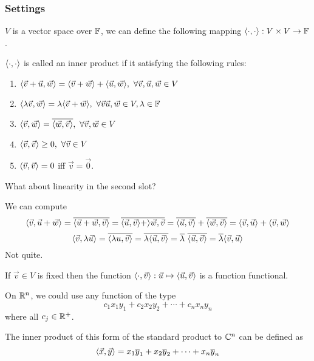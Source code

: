\subsubsection*{Settings}
$V$ is a vector space over $\mathbb F$, we can define the following mapping $ \langle \cdot, \cdot \rangle : V \times V \to \mathbb F$.
\begin{definition}
$\langle \cdot, \cdot \rangle$ is called an inner product if it satisfying the following rules:
\begin{enumerate}
    \item $\langle \vec v + \vec u, \vec w \rangle = \langle \vec v + \vec w \rangle + \langle \vec u, \vec w \rangle, \ \forall \vec v, \vec u, \vec w \in V$
    \item $\langle \lambda \vec v, \vec w \rangle = \lambda \langle \vec v + \vec w \rangle, \ \forall \vec v \vec u, \vec w \in V, \lambda \in \mathbb F$
    \item $\langle \vec v, \vec w \rangle = \overline{\langle \vec w, \vec v \rangle}, \ \forall \vec v,\vec w \in V$
    \item $\la \vec v, \vec v \ra \geq 0, \ \forall \vec v \in V$
    \item $\langle \vec v, \vec v \rangle = 0$ iff $\vec v = \vec 0$.
\end{enumerate}
\end{definition}
\begin{question}
What about linearity in the second slot?
\end{question}
\begin{answer} We can compute
\[ \langle \vec v, \vec u + \vec w \rangle = \overline{\langle \vec u + \vec w, \vec v\rangle} = \overline{\langle \vec u, \vec v \rangle + \rangle \vec w, \vec v} = \overline{\langle \vec u, \vec v \rangle} + \overline{\langle \vec w, \vec v\rangle } = \langle \vec v, \vec u\rangle + \langle \vec v, \vec w\rangle\]
\[ \langle \vec v, \lambda \vec u\rangle = \overline{\langle \lambda u, \vec v\rangle} = \overline{\lambda \langle \vec u,\vec v\rangle} = \overline \lambda \ \overline{\langle \vec u, \vec v\rangle} = \overline \lambda \langle \vec v, \vec u \rangle\]
Not quite. \frownie{}
\end{answer}
\begin{remark}
    If $\vec v \in V$ is fixed then the function $\langle \cdot, \vec v \rangle : \vec u \mapsto \langle \vec u, \vec v \rangle$ is a function functional. 
\end{remark}
\begin{example}
    On $\mathbb R^n$, we could use any function of the type
    \[ c_1x_1y_1 + c_2x_2y_2 + \cdots + c_nx_ny_n\] where all $c_j \in \mathbb R^+$.
\end{example}
\begin{remark}[Generalization to $\b C^n$]
    The inner product of this form of the standard product to $\b C^n$ can be defined as
    \[ \langle \vec x, \vec y \rangle = x_1\overline y_1 + x_2\overline y_2 + \cdots + x_n\overline y_n\]
\end{remark}